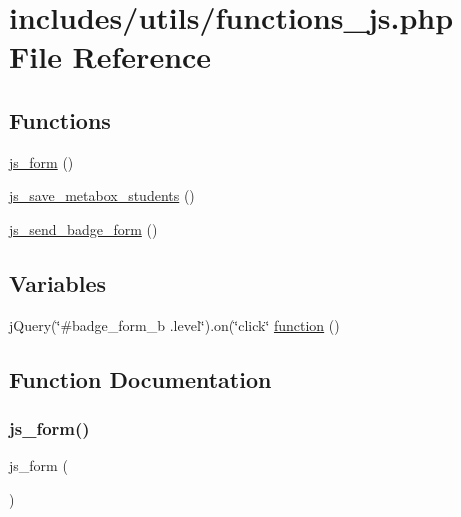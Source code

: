 \hypertarget{functions__js_8php}{}\section{includes/utils/functions\+\_\+js.php File Reference}
\label{functions__js_8php}
\subsection*{Functions}
\begin{DoxyCompactItemize}
\item 
\hyperlink{functions__js_8php_a00a0bd3c762e5e17cfd2f9529822845e}{js\+\_\+form} ()
\item 
\hyperlink{functions__js_8php_ab7dc6ec316c73c2bbbbb7b36139eb729}{js\+\_\+save\+\_\+metabox\+\_\+students} ()
\item 
\hyperlink{functions__js_8php_a7f99f817b8c8edf2fb928c67f28d7e61}{js\+\_\+send\+\_\+badge\+\_\+form} ()
\end{DoxyCompactItemize}
\subsection*{Variables}
\begin{DoxyCompactItemize}
\item 
j\+Query(\char`\"{}\#badge\+\_\+form\+\_\+b .level\char`\"{}).on(\char`\"{}click\char`\"{} \hyperlink{functions__js_8php_a8469038065f9d14cd1e418d4a56fb290}{function} ()
\end{DoxyCompactItemize}


\subsection{Function Documentation}
\mbox{\label{functions__js_8php_a00a0bd3c762e5e17cfd2f9529822845e}} 
\subsubsection{\texorpdfstring{js\+\_\+form()}{js\_form()}}
{\footnotesize\ttfamily js\+\_\+form (\begin{DoxyParamCaption}{ }\end{DoxyParamCaption})}

